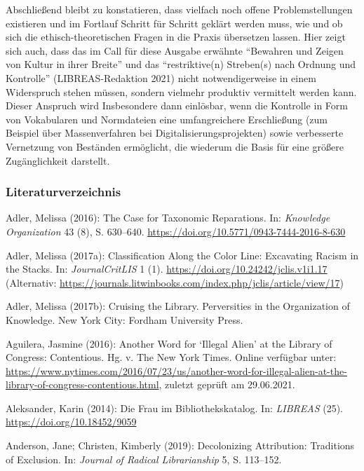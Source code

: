 \documentclass[a4paper,
fontsize=11pt,
oneside,
numbers=noperiodatend,
parskip=half-,
bibliography=totoc,
final
]{scrartcl}
\begin{document}
Abschließend bleibt zu konstatieren, dass vielfach noch offene
Problemstellungen existieren und im Fortlauf Schritt für Schritt geklärt
werden muss, wie und ob sich die ethisch-theoretischen Fragen in die
Praxis übersetzen lassen. Hier zeigt sich auch, dass das im Call für
diese Ausgabe erwähnte \enquote{Bewahren und Zeigen von Kultur in ihrer
Breite} und das \enquote{restriktive(n) Streben(s) nach Ordnung und
Kontrolle} (LIBREAS-Redaktion 2021) nicht notwendigerweise in einem
Widerspruch stehen müssen, sondern vielmehr produktiv vermittelt werden
kann. Dieser Anspruch wird Insbesondere dann einlösbar, wenn die
Kontrolle in Form von Vokabularen und Normdateien eine umfangreichere
Erschließung (zum Beispiel über Massenverfahren bei
Digitalisierungsprojekten) sowie verbesserte Vernetzung von Beständen
ermöglicht, die wiederum die Basis für eine größere Zugänglichkeit
darstellt.

\hypertarget{literaturverzeichnis}{%
\subsubsection{Literaturverzeichnis}\label{literaturverzeichnis}}

Adler, Melissa (2016): The Case for Taxonomic Reparations. In:
\emph{Knowledge Organization} 43 (8), S. 630--640.
\url{https://doi.org/10.5771/0943-7444-2016-8-630}

Adler, Melissa (2017a): Classification Along the Color Line: Excavating
Racism in the Stacks. In: \emph{JournalCritLIS} 1 (1).
\url{https://doi.org/10.24242/jclis.v1i1.17} (Alternativ: \url{https://journals.litwinbooks.com/index.php/jclis/article/view/17})

Adler, Melissa (2017b): Cruising the Library. Perversities in the
Organization of Knowledge. New York City: Fordham University Press.

Aguilera, Jasmine (2016): Another Word for \enquote*{Illegal Alien} at
the Library of Congress: Contentious. Hg. v. The New York Times. Online
verfügbar unter:
\url{https://www.nytimes.com/2016/07/23/us/another-word-for-illegal-alien-at-the-library-of-congress-contentious.html},
zuletzt \linebreak geprüft am 29.06.2021.

Aleksander, Karin (2014): Die Frau im Bibliothekskatalog. In:
\emph{LIBREAS} (25). \url{https://doi.org/10.18452/9059}

Anderson, Jane; Christen, Kimberly (2019): Decolonizing Attribution:
Traditions of Exclusion. In: \emph{Journal of Radical Librarianship} 5,
S. 113--152.
\end{document}
